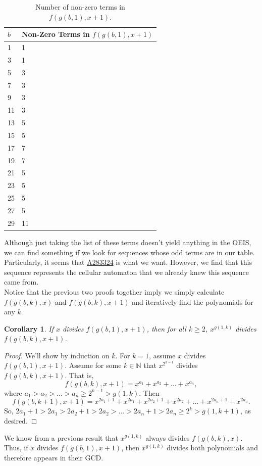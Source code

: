 \documentclass{article}
\newtheorem{corollary}{Corollary}
\newcommand{\N}{\mathbb{N}}
\begin{document}
	\begin{table}[H]
		\centering
		\begin{tabular}{|l||l|}
			\hline
			$b$ & Non-Zero Terms in $f(g(b,1),x+1)$ \\
			\hline\hline
			1 & 1 \\
			\hline
			3 & 1 \\
			\hline
			5 & 3 \\
			\hline
			7 & 3 \\
			\hline
			9 & 3 \\
			\hline
			11 & 3 \\
			\hline
			13 & 5 \\
			\hline
			15 & 5 \\
			\hline
			17 & 7 \\
			\hline
			19 & 7 \\
			\hline
			21 & 5 \\
			\hline
			23 & 5 \\
			\hline
			25 & 5 \\
			\hline
			27 & 5 \\
			\hline
			29 & 11 \\
			\hline
		\end{tabular}
		\caption{Number of non-zero terms in $f(g(b,1),x+1)$.}
	\end{table}
	Although just taking the list of these terms doesn't yield anything in the OEIS, we can find something if we look for sequences whose odd terms are in our table.
	Particularly, it seems that \href{https://oeis.org/A283324}{A283324} is what we want.
	However, we find that this sequence represents the cellular automaton that we already knew this sequence came from. \\
	
	Notice that the previous two proofs together imply we simply calculate $f(g(b,k),x)$ and $f(g(b,k),x+1)$ and iteratively find the polynomials for any $k$.
	
	\begin{corollary}
		If $x$ divides $f(g(b,1),x+1)$, then for all $k \geq 2$, $x^{g(1,k)}$ divides $f(g(b,k),x+1)$.
	\end{corollary}
	\begin{proof}
		We'll show by induction on $k$.
		For $k=1$, assume $x$ divides $f(g(b,1),x+1)$.
		Assume for some $k \in \N$ that $x^{2^{k-1}}$ divides $f(g(b,k),x+1)$.
		That is,
		\begin{equation*}
			f(g(b,k),x+1) = x^{a_1} + x^{a_2} + \dots + x^{a_n},
		\end{equation*}
		where $a_1 > a_2 > \dots > a_n \geq 2^{k-1} > g(1,k)$.
		Then
		\begin{equation*}
			f(g(b,k+1),x+1) = x^{2a_1+1} + x^{2a_1} + x^{2a_2+1} + x^{2a_2} + \dots + x^{2a_n+1} + x^{2a_n}.
		\end{equation*}
		So, $2a_1 + 1 > 2a_1 > 2a_2 + 1 > 2a_2 > \dots > 2a_n + 1 > 2a_n \geq 2^{k} > g(1,k+1)$, as desired.
	\end{proof}
	We know from a previous result that $x^{g(1,k)}$ always divides $f(g(b,k),x)$.
	Thus, if $x$ divides $f(g(b,1),x+1)$, then $x^{g(1,k)}$ divides both polynomials and therefore appears in their GCD.
\end{document}
